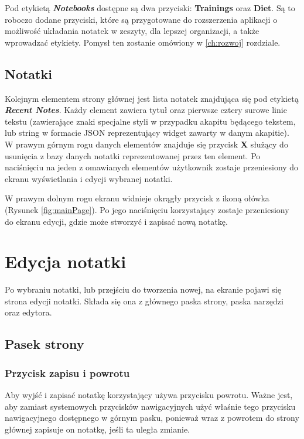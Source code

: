 Pod etykietą \textbf{\textit{Notebooks}} dostępne są dwa przyciski: \textbf{Trainings} oraz \textbf{Diet}. Są to roboczo dodane przyciski, które są przygotowane do rozszerzenia aplikacji o możliwość układania notatek w zeszyty, dla lepszej organizacji, a także wprowadzać etykiety.
Pomysł ten zostanie omówiony w \ref{ch:rozwoj} rozdziale.

\subsection{Notatki}

Kolejnym elementem strony głównej jest lista notatek znajdująca się pod etykietą \textbf{\textit{Recent Notes}}. Każdy element zawiera tytuł oraz pierwsze cztery surowe linie tekstu (zawierające znaki specjalne styli w przypadku akapitu będącego tekstem, lub string w formacie JSON reprezentujący widget zawarty w danym akapitie).
W prawym górnym rogu danych elementów znajduje się przycisk \textbf{X} służący do usunięcia z bazy danych notatki reprezentowanej przez ten element.
Po naciśnięciu na jeden z omawianych elementów użytkownik zostaje przeniesiony do ekranu wyświetlania i edycji wybranej notatki.

W prawym dolnym rogu ekranu widnieje okrągły przycisk z ikoną ołówka (Rysunek \ref{fig:mainPage}).
Po jego naciśnięciu korzystający zostaje przeniesiony do ekranu edycji, gdzie może stworzyć i zapisać nową notatkę.

\section{Edycja notatki}

Po wybraniu notatki, lub przejściu do tworzenia nowej, na ekranie pojawi się strona edycji notatki. Składa się ona z głównego paska strony, paska narzędzi oraz edytora.

\subsection{Pasek strony}

\subsubsection{Przycisk zapisu i powrotu}

Aby wyjść i zapisać notatkę korzystający używa przycisku powrotu.
Ważne jest, aby zamiast systemowych przycisków nawigacyjnych użyć właśnie tego przycisku nawigacyjnego dostępnego w górnym pasku, ponieważ wraz z powrotem do strony głównej zapisuje on notatkę, jeśli ta uległa zmianie.

